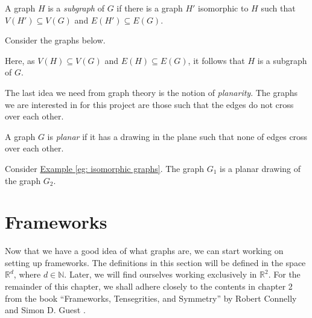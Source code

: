 \begin{definition}
A graph $H$ is a \textit{subgraph} of $G$ if there is a graph $H'$ isomorphic to $H$ such that $V(H') \subseteq V(G)$ and $E(H') \subseteq E(G)$.
\end{definition}

\begin{example}
Consider the graphs below.

\begin{figure}[ht]
    \centering
    
\end{figure}
\noindent
Here, as $V(H) \subseteq V(G)$ and $E(H) \subseteq E(G)$, it follows that $H$ is a subgraph of $G$.
\end{example}

\begin{flushleft}
The last idea we need from graph theory is the notion of \textit{planarity}. The graphs we are interested in for this project are those such that the edges do not cross over each other.
\end{flushleft}

\begin{definition}
    \label{def: planar graphs}
    A graph $G$ is \textit{planar} if it has a drawing in the plane such that none of edges cross over each other.
\end{definition}

\begin{example}
    Consider \hyperref[eg: isomorphic graphs]{Example \ref*{eg: isomorphic graphs}}. The graph $G_1$ is a planar drawing of the graph $G_2$.
\end{example}

\section{Frameworks}

\begin{flushleft}
    Now that we have a good idea of what graphs are, we can start working on setting up frameworks. The definitions in this section will be defined in the space $\mathbb{R}^d$, where $d \in \mathbb{N}$. Later, we will find ourselves working exclusively in $\mathbb{R}^2$. For the remainder of this chapter, we shall adhere closely to the contents in chapter 2 from the book ``Frameworks, Tensegrities, and Symmetry'' by Robert Connelly and Simon D. Guest \cite{textbook}.
\end{flushleft}

